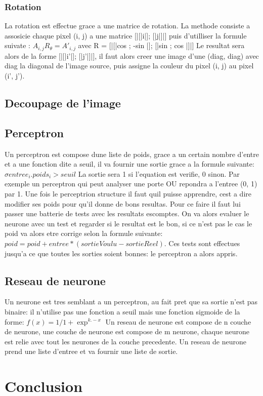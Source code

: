 \documentclass{article}
\begin{document}
\subsubsection{Rotation}
La rotation est effectue grace a une matrice de rotation. La methode consiste a assosicie chaque pixel (i, j) a une matrice [|[|i|]; [|j|]|] puis d'utilliser la formule suivate : 
$A_{i,j}R_{\theta} = A'_{i,j}$ avec R = [|[|cos \theta; -sin \theta|]; [|sin \theta; cos \theta|]|] 
Le resultat sera alors de la forme [|[|i'|]; [|j'|]|], il faut alors creer une image d'une (diag, diag) avec diag la diagonal de l'image source, puis assigne la couleur du pixel (i, j) au pixel (i', j').


\subsection{Decoupage de l'image}
\subsection{Perceptron}
Un perceptron est compose dune liste de poids, grace a un certain nombre d'entre et a une fonction dite a seuil, il va fournir une sortie grace a la formule suivante: 
$\sigma entree_{i}.poids_{i} > seuil$
La sortie sera 1 si l'equation est verifie, 0 sinon. Par exemple un perceptron qui peut analyser une porte OU repondra a l'entree (0, 1) par 1.
Une fois le perceptrion structure il faut quil puisse apprendre, cest a dire modifier ses poids pour qu'il donne de bons resultas. Pour ce faire il faut lui passer une batterie de tests avec les resultats escomptes. On va alors evaluer le neurone avec un test et regarder si le resultat est le bon, si ce n'est pas le cas le poid va alors etre corrige selon la formule suivante: 
$poid = poid + entree*(sortieVoulu - sortieReel)$.
Ces tests sont effectues jusqu'a ce que toutes les sorties soient bonnes: le perceptron a alors appris.

\subsection{Reseau de neurone}
Un neurone est tres semblant a un perceptron, au fait pret que sa sortie n'est pas binaire: il n'utilise pas une fonction a seuil mais une fonction sigmoide de la forme: 
$f(x) = 1 / 1 + \exp ^{k.-x}$
Un reseau de neurone est compose de n couche de neurone, une couche de neurone est compose de m neurone, chaque neurone est relie avec tout les neurones de la couche precedente. Un reseau de neurone prend une liste d'entree et va fournir une liste de sortie.

\section{Conclusion}
\end{document}
